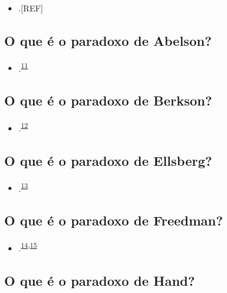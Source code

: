 \documentclass[
  a4paper,
]{book}
\providecommand{\tightlist}{%
  \setlength{\itemsep}{0pt}\setlength{\parskip}{0pt}}
\begin{document}
\begin{itemize}
\tightlist
\item
  .{[}REF{]}
\end{itemize}

\hypertarget{abelson}{%
\subsection{O que é o paradoxo de Abelson?}\label{abelson}}

\begin{itemize}
\tightlist
\item
  .\textsuperscript{\protect\hyperlink{ref-abelson1985}{11}}
\end{itemize}

\hypertarget{Berkson}{%
\subsection{O que é o paradoxo de Berkson?}\label{Berkson}}

\begin{itemize}
\tightlist
\item
  .\textsuperscript{\protect\hyperlink{ref-berkson1946}{12}}
\end{itemize}

\hypertarget{ellsberg}{%
\subsection{O que é o paradoxo de Ellsberg?}\label{ellsberg}}

\begin{itemize}
\tightlist
\item
  .\textsuperscript{\protect\hyperlink{ref-ellsberg1961}{13}}
\end{itemize}

\hypertarget{freedman}{%
\subsection{O que é o paradoxo de Freedman?}\label{freedman}}

\begin{itemize}
\tightlist
\item
  .\textsuperscript{\protect\hyperlink{ref-freedman1983}{14},\protect\hyperlink{ref-freedman1989}{15}}
\end{itemize}

\hypertarget{hand}{%
\subsection{O que é o paradoxo de Hand?}\label{hand}}
\end{document}
